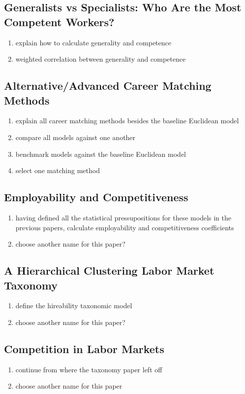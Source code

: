 \documentclass{elsarticle} %
\begin{document}
\subsection{Generalists vs Specialists: Who Are the Most Competent Workers?}
\begin{enumerate}
    \item explain how to calculate generality and competence
    \item weighted correlation between generality and competence
\end{enumerate}

\subsection{Alternative/Advanced Career Matching Methods}
\begin{enumerate}
    \item explain all career matching methods besides the baseline Euclidean model
    \item compare all models against one another
    \item benchmark models against the baseline Euclidean model
    \item select one matching method
\end{enumerate}

\subsection{Employability and Competitiveness}
\begin{enumerate}
    \item having defined all the statistical pressupositions for these models in the
          previous papers, calculate employability and competitiveness coefficients
    \item choose another name for this paper?
\end{enumerate}

\subsection{A Hierarchical Clustering Labor Market Taxonomy}
\begin{enumerate}
    \item define the hireability taxonomic model
    \item choose another name for this paper?
\end{enumerate}

\subsection{Competition in Labor Markets}
\begin{enumerate}
    \item continue from where the taxonomy paper left off
    \item choose another name for this paper
\end{enumerate}
\end{document}
